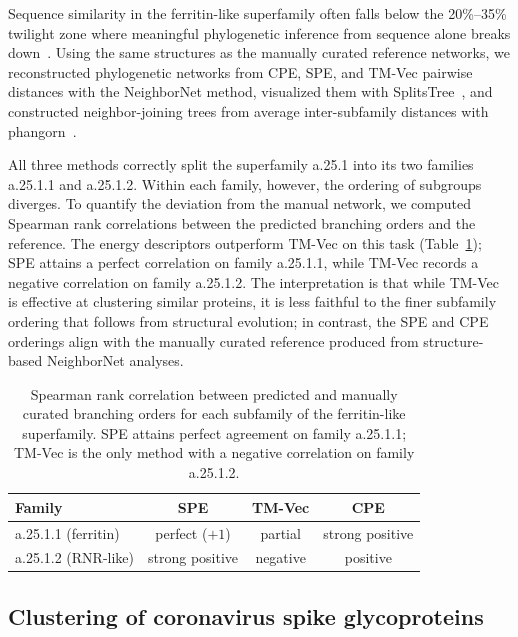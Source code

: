 \documentclass[11pt]{article}
\begin{document}
Sequence similarity in the ferritin-like superfamily often falls below the
20\%--35\% twilight zone where meaningful phylogenetic inference from
sequence alone breaks down~\citep{chothia1986twilight,lundin2012ferritin}.
Using the same structures as the manually curated reference networks, we
reconstructed phylogenetic networks from CPE, SPE, and TM-Vec pairwise
distances with the NeighborNet method, visualized them with
SplitsTree~\citep{huson2024splitstree}, and constructed neighbor-joining
trees from average inter-subfamily distances with
phangorn~\citep{schliep2011phangorn}.

All three methods correctly split the superfamily a.25.1 into its two
families a.25.1.1 and a.25.1.2. Within each family, however, the ordering
of subgroups diverges. To quantify the deviation from the manual network,
we computed Spearman rank correlations between the predicted branching
orders and the reference. The energy descriptors outperform TM-Vec on this
task (Table~\ref{tab:tab2}); SPE attains a perfect correlation on
family a.25.1.1, while TM-Vec records a negative correlation on family
a.25.1.2. The interpretation is that while TM-Vec is effective at clustering
similar proteins, it is less faithful to the finer subfamily ordering that
follows from structural evolution; in contrast, the SPE and CPE orderings
align with the manually curated reference produced from structure-based
NeighborNet analyses.

\begin{table}[t]
\centering
\caption{Spearman rank correlation between predicted and manually curated
branching orders for each subfamily of the ferritin-like superfamily.
SPE attains perfect agreement on family a.25.1.1; TM-Vec is the only method
with a negative correlation on family a.25.1.2.}
\label{tab:tab2}
\begin{tabular}{lccc}
\toprule
Family & SPE & TM-Vec & CPE \\
\midrule
a.25.1.1 (ferritin) & perfect ($+1$) & partial & strong positive \\
a.25.1.2 (RNR-like) & strong positive & negative & positive \\
\bottomrule
\end{tabular}
\end{table}

\subsection{Clustering of coronavirus spike glycoproteins}
\end{document}
